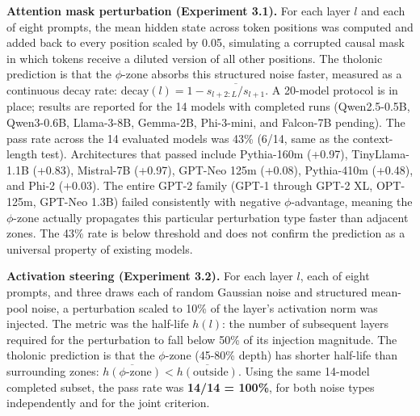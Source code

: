 \documentclass[
  11pt,
  letterpaper,
]{article}
\begin{document}
\textbf{Attention mask perturbation (Experiment 3.1).} For each layer
\(l\) and each of eight prompts, the mean hidden state across token
positions was computed and added back to every position scaled by 0.05,
simulating a corrupted causal mask in which tokens receive a diluted
version of all other positions. The tholonic prediction is that the
\(\phi\)-zone absorbs this structured noise faster, measured as a
continuous decay rate:
\(\text{decay}(l) = 1 - \overline{s_{l+2:L}/s_{l+1}}\). A 20-model
protocol is in place; results are reported for the 14 models with
completed runs (Qwen2.5-0.5B, Qwen3-0.6B, Llama-3-8B, Gemma-2B,
Phi-3-mini, and Falcon-7B pending). The pass rate across the 14
evaluated models was 43\% (6/14, same as the context-length test).
Architectures that passed include Pythia-160m (+0.97), TinyLlama-1.1B
(+0.83), Mistral-7B (+0.97), GPT-Neo 125m (+0.08), Pythia-410m (+0.48),
and Phi-2 (+0.03). The entire GPT-2 family (GPT-1 through GPT-2 XL,
OPT-125m, GPT-Neo 1.3B) failed consistently with negative
\(\phi\)-advantage, meaning the \(\phi\)-zone actually propagates this
particular perturbation type faster than adjacent zones. The 43\% rate
is below threshold and does not confirm the prediction as a universal
property of existing models.

\textbf{Activation steering (Experiment 3.2).} For each layer \(l\),
each of eight prompts, and three draws each of random Gaussian noise and
structured mean-pool noise, a perturbation scaled to 10\% of the layer's
activation norm was injected. The metric was the half-life \(h(l)\): the
number of subsequent layers required for the perturbation to fall below
50\% of its injection magnitude. The tholonic prediction is that the
\(\phi\)-zone (45-80\% depth) has shorter half-life than surrounding
zones:
\(\overline{h(\phi\text{-zone})} < \overline{h(\text{outside})}\). Using
the same 14-model completed subset, the pass rate was \textbf{14/14 =
100\%}, for both noise types independently and for the joint criterion.
\end{document}
